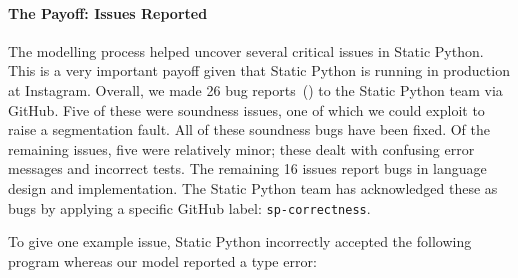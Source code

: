 \documentclass[english,cleveref,crc]{programming}
\newcommand{\SP}{Static Python}
\begin{document}
\paragraph{The Payoff: Issues Reported}


The modelling process helped uncover several critical issues in \SP{}.
This is a very important payoff given that \SP{} is running in production at
Instagram.
Overall, we made 26 bug reports~() to the \SP{} team via GitHub.
Five of these were soundness issues, one of which we could exploit to raise
a segmentation fault.
All of these soundness bugs have been fixed.
Of the remaining issues, five were relatively minor; these dealt with confusing error messages
and incorrect tests.
The remaining 16 issues report bugs in language design and implementation.
The \SP{} team has acknowledged these as bugs by applying a specific GitHub label: \lstinline{sp-correctness}.


To give one example issue, \SP{} incorrectly accepted the following program whereas our model
reported a type error:
\end{document}
